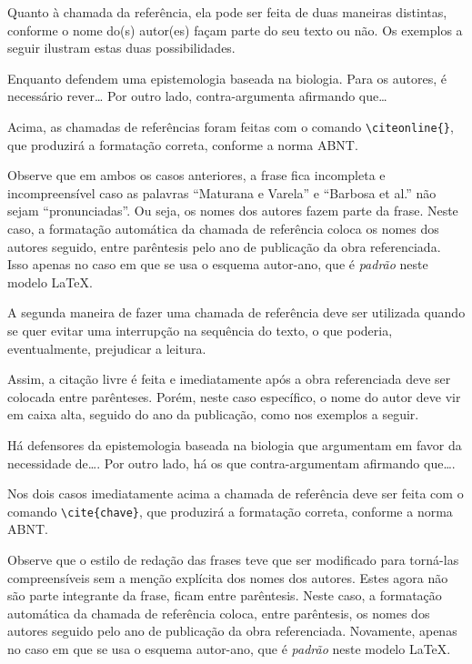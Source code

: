 \begin{apendicesenv}
    Quanto à chamada da referência, ela pode ser feita de duas maneiras distintas, conforme o nome do(s) autor(es) façam parte do seu texto ou não.
    Os exemplos a seguir ilustram estas duas possibilidades.

    Enquanto  defendem uma epistemologia baseada na biologia.
    Para os autores, é necessário rever\ldots
    Por outro lado,  contra-argumenta afirmando que\ldots

    Acima, as chamadas de referências foram feitas com o comando \verb|\citeonline{}|, que produzirá a formatação correta, conforme a norma ABNT.

    Observe que em ambos os casos anteriores, a frase fica incompleta e incompreensível caso as palavras ``Maturana e Varela'' e ``Barbosa et al.'' não sejam ``pronunciadas''.
    Ou seja, os nomes dos autores fazem parte da frase.
    Neste caso, a formatação automática da chamada de referência coloca os nomes dos autores seguido, entre parêntesis pelo ano de publicação da obra referenciada.
    Isso apenas no caso em que se usa o esquema autor-ano, que é \textit{padrão} neste modelo \LaTeX{}.

    A segunda maneira de fazer uma chamada de referência deve ser utilizada quando se quer evitar uma interrupção na sequência do texto, o que poderia, eventualmente, prejudicar a leitura.

    \newpage

    Assim, a citação livre é feita e imediatamente após a obra referenciada deve ser colocada entre parênteses.
    Porém, neste caso específico, o nome do autor deve vir em caixa alta, seguido do ano da publicação, como nos exemplos a seguir.

    Há defensores da epistemologia baseada na biologia que argumentam em favor da necessidade de\ldots \cite{Maturana2003}.
    Por outro lado, há os que contra-argumentam afirmando que\ldots  \cite{nunes2017local}.

    Nos dois casos imediatamente acima a chamada de referência deve ser feita com o comando \verb|\cite{chave}|, que produzirá a formatação correta, conforme a norma ABNT.

    Observe que o estilo de redação das frases teve que ser modificado para torná-las compreensíveis sem a menção explícita dos nomes dos autores.
    Estes agora não são parte integrante da frase, ficam entre parêntesis.
    Neste caso, a formatação automática da chamada de referência coloca, entre parêntesis, os nomes dos autores seguido pelo ano de publicação da obra referenciada.
    Novamente, apenas no caso em que se usa o esquema autor-ano, que é \textit{padrão} neste modelo \LaTeX{}.


\end{apendicesenv}
